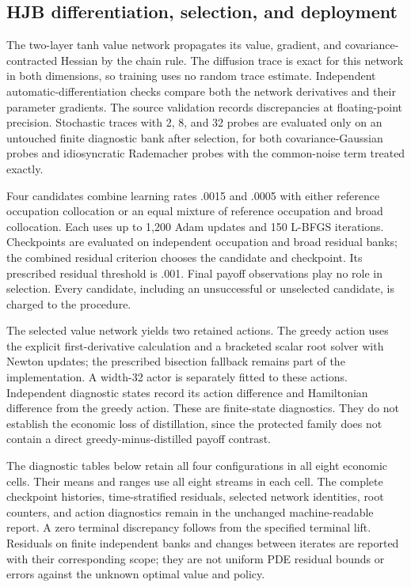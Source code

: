 \subsection{HJB differentiation, selection, and deployment}
The two-layer tanh value network propagates its value, gradient, and
covariance-contracted Hessian by the chain rule. The diffusion trace is exact
for this network in both dimensions, so training uses no random trace
estimate. Independent automatic-differentiation checks compare both the
network derivatives and their parameter gradients. The source validation
records discrepancies at floating-point precision. Stochastic traces with
2, 8, and 32 probes are evaluated only on an untouched finite diagnostic
bank after selection, for both covariance-Gaussian probes and idiosyncratic
Rademacher probes with the common-noise term treated exactly.

Four candidates combine learning rates .0015 and .0005 with either
reference occupation collocation or an equal mixture of reference occupation
and broad collocation. Each uses up to 1,200 Adam updates and 150 L-BFGS
iterations. Checkpoints are evaluated on independent occupation and broad
residual banks; the combined residual criterion chooses the candidate and
checkpoint. Its prescribed residual threshold is .001. Final payoff
observations play no role in selection. Every candidate, including an
unsuccessful or unselected candidate, is charged to the procedure.

The selected value network yields two retained actions. The greedy action
uses the explicit first-derivative calculation and a bracketed scalar root
solver with Newton updates; the prescribed bisection fallback remains part
of the implementation. A width-32 actor is separately fitted to these
actions. Independent diagnostic states record its action difference and
Hamiltonian difference from the greedy action. These are finite-state
diagnostics. They do not establish the economic loss of distillation, since
the protected family does not contain a direct greedy-minus-distilled
payoff contrast.

The diagnostic tables below retain all four configurations in all eight
economic cells. Their means and ranges use all eight streams in each cell.
The complete checkpoint histories, time-stratified residuals, selected
network identities, root counters, and action diagnostics remain in the
unchanged machine-readable report. A zero terminal discrepancy follows
from the specified terminal lift. Residuals on finite independent banks and
changes between iterates are reported with their corresponding scope;
they are not uniform PDE residual bounds or errors against the unknown
optimal value and policy.

